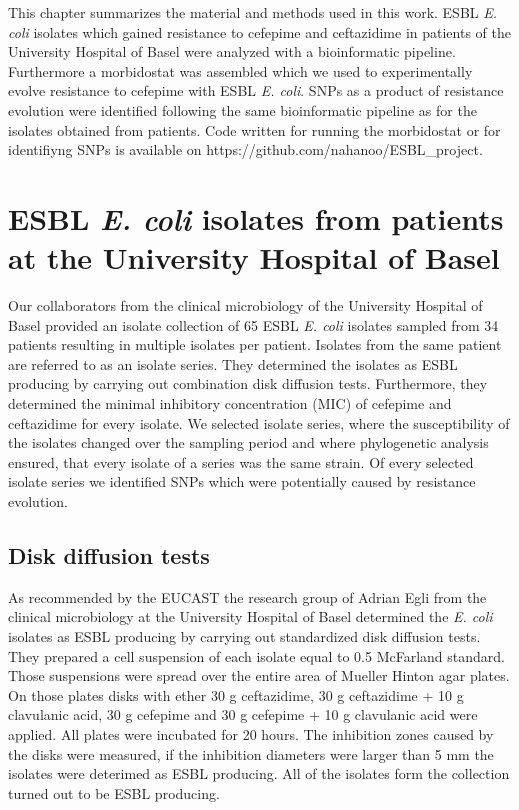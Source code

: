 This chapter summarizes the material and methods used in this work. ESBL \textit{E. coli} isolates which gained resistance to cefepime and ceftazidime in patients of the University Hospital of Basel were analyzed with a bioinformatic pipeline. Furthermore a morbidostat was assembled which we used to experimentally evolve resistance to cefepime with ESBL \textit{E. coli}. SNPs as a product of resistance evolution were identified following the same bioinformatic pipeline as for the isolates obtained from patients. Code written for running the morbidostat or for identifiyng SNPs is available on  https://github.com/nahanoo/ESBL\_project.

\section{ESBL \textit{E. coli} isolates from patients at the University Hospital of Basel}
Our collaborators from the clinical microbiology of the University Hospital of Basel provided an isolate collection of 65 ESBL \textit{E. coli} isolates sampled from 34 patients resulting in multiple isolates per patient. Isolates from the same patient are referred to as an isolate series. They determined the isolates as ESBL producing by carrying out combination disk diffusion tests. Furthermore, they determined the minimal inhibitory concentration (MIC) of cefepime and ceftazidime for every isolate. We selected isolate series, where the susceptibility of the isolates changed over the sampling period and where phylogenetic analysis ensured, that every isolate of a series was the same strain. Of every selected isolate series we identified SNPs which were potentially caused by resistance evolution. 
\label{section:sample_collection}

\subsection{Disk diffusion tests}
As recommended by the EUCAST the research group of Adrian Egli from the clinical microbiology at the University Hospital of Basel determined the \textit{E. coli} isolates as ESBL producing by carrying out standardized disk diffusion tests. \\
They prepared a cell suspension of each isolate equal to 0.5 McFarland standard. Those suspensions were spread over the entire area of Mueller Hinton agar plates. On those plates disks with ether 30 \textmu g ceftazidime, 30 \textmu g ceftazidime + 10 \textmu g clavulanic acid, 30 \textmu g cefepime and 30 \textmu g cefepime + 10 \textmu g clavulanic acid were applied. All plates were incubated for 20 hours. The inhibition zones caused by the disks were measured, if the inhibition diameters were larger than 5 mm the isolates were deterimed as ESBL producing. All of the isolates form the collection turned out to be ESBL producing. 

